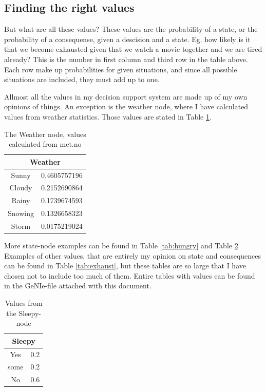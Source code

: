 \subsection{Finding the right values}
But what are all these values? These values are the probability of a
state, or the probability of a consequense, given a descision and a state. Eg.
how likely is it that we become exhausted given that we watch a movie together
and we are tired already? This is the number in first column and third row in
the table above. Each row make up probabilities for given situations, and since
all possible situations are included, they must add up to one.

Allmost all the values in my decision support system are made up of my own
opinions of things. An exception is the weather node, where I have calculated
values from weather statistics\cite{met}. Those values are stated in Table
\ref{tab:weather}.
\begin{table}[h!!!]
\begin{tabular}{|c|c|}
\hline
\multicolumn{2}{|c|}{Weather}\\
\hline
Sunny & 0.4605757196\\
Cloudy & 0.2152690864\\
Rainy & 0.1739674593\\
Snowing & 0.1326658323\\
Storm & 0.0175219024\\
\hline
\end{tabular}
\caption{The Weather node, values calculated from met.no\cite{met}}
\label{tab:weather}
\end{table}
More state-node examples can be found in Table \ref{tab:hungry} and Table
\ref{tab:sleepy} Examples of other values, that are entirely my opinion on state
and consequences can be found in Table \ref{tab:exhaust}, but these tables are
so large that I have chosen not to include too much of them. Entire tables with
values can be found in the GeNIe-file attached with this document.
\begin{table}
\begin{tabular}{|c|c|}
\hline
\multicolumn{2}{|c|}{Sleepy}\\
\hline
Yes & 0.2\\
some & 0.2\\
No & 0.6\\
\hline
\end{tabular}
\label{tab:sleepy}
\caption{Values from the Sleepy-node}
\end{table}

